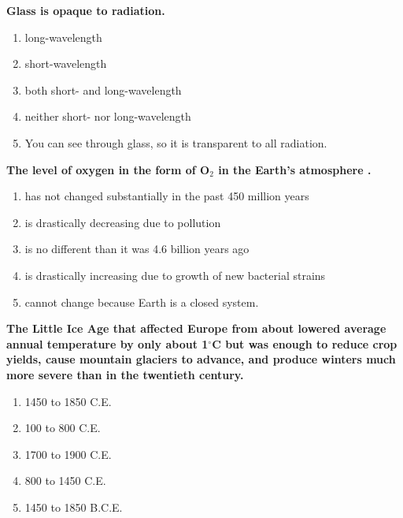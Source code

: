 \item {
\setlength{\itemsep}{0cm}
\setlength{\parskip}{.2cm}
\begin{samepage}
\textbf{
Glass is opaque to \makebox[1cm]{\Rivpt\hrulefill\Rivpt} radiation.
}
\begin{enumerate}
\item {  long-wavelength }
\item {  short-wavelength }
\item {  both short- and long-wavelength  }
\item {  neither short- nor long-wavelength }
\item {  You can see through glass, so it is transparent to all radiation. }
\end{enumerate}
\end{samepage}
}
\item {
\setlength{\itemsep}{0cm}
\setlength{\parskip}{.2cm}
\begin{samepage}
\textbf{
The level of oxygen in the form of O\ensuremath{_2} in the Earth's atmosphere \makebox[1cm]{\Rivpt\hrulefill\Rivpt}.
}
\begin{enumerate}
\item {  has not changed substantially in the past 450 million years }
\item {  is drastically decreasing due to pollution }
\item {  is no different than it was 4.6 billion years ago }
\item {  is drastically increasing due to growth of new bacterial strains }
\item {  cannot change because Earth is a closed system.  }
\end{enumerate}
\end{samepage}
}
\item {
\setlength{\itemsep}{0cm}
\setlength{\parskip}{.2cm}
\begin{samepage}
\textbf{
The Little Ice Age that affected Europe from about \makebox[1cm]{\Rivpt\hrulefill\Rivpt} lowered average annual temperature by only about 1\ensuremath{^\circ}C but was enough to reduce crop yields, cause mountain glaciers to advance, and produce winters much more severe than in the twentieth century.
}
\begin{enumerate}
\item {  1450 to 1850 C.E. }
\item {  100 to 800 C.E. }
\item {  1700 to 1900 C.E. }
\item {  800 to 1450 C.E. }
\item {  1450 to 1850 B.C.E. }
\end{enumerate}
\end{samepage}
}
